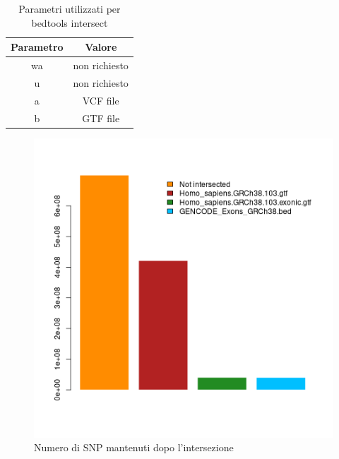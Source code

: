   \begin{table}[H]
        \centering
        \begin{tabular}{|c|c|}
                \hline
                Parametro & Valore\\
                \hline
                wa & non richiesto\\
                \hline
                u & non richiesto\\
                \hline
                a & VCF file\\
                \hline
                b & GTF file\\
                \hline
         \end{tabular}
         \caption{Parametri utilizzati per bedtools intersect}
  \end{table}
  \begin{figure}[H]
    \centering
    \includegraphics[scale=0.6]{scelta_gtf.png}
    \caption{Numero di SNP mantenuti dopo l'intersezione}
    \label{fig:intersection}
  \end{figure}

